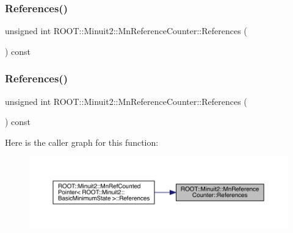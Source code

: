 \subsubsection{\texorpdfstring{References()}{References()}\hspace{0.1cm}{\footnotesize\ttfamily [1/3]}}
{\footnotesize\ttfamily unsigned int R\+O\+O\+T\+::\+Minuit2\+::\+Mn\+Reference\+Counter\+::\+References (\begin{DoxyParamCaption}{ }\end{DoxyParamCaption}) const\hspace{0.3cm}{\ttfamily [inline]}}

\mbox{\label{classROOT_1_1Minuit2_1_1MnReferenceCounter_a8c4e8a4427e3f5eeaad4001a364f8a5a}} 
\subsubsection{\texorpdfstring{References()}{References()}\hspace{0.1cm}{\footnotesize\ttfamily [2/3]}}
{\footnotesize\ttfamily unsigned int R\+O\+O\+T\+::\+Minuit2\+::\+Mn\+Reference\+Counter\+::\+References (\begin{DoxyParamCaption}{ }\end{DoxyParamCaption}) const\hspace{0.3cm}{\ttfamily [inline]}}

Here is the caller graph for this function\+:
\nopagebreak
\begin{figure}[H]
\begin{center}
\leavevmode
\includegraphics[width=350pt]{dc/da2/classROOT_1_1Minuit2_1_1MnReferenceCounter_a8c4e8a4427e3f5eeaad4001a364f8a5a_icgraph}
\end{center}
\end{figure}
\mbox{\label{classROOT_1_1Minuit2_1_1MnReferenceCounter_a8c4e8a4427e3f5eeaad4001a364f8a5a}} 
